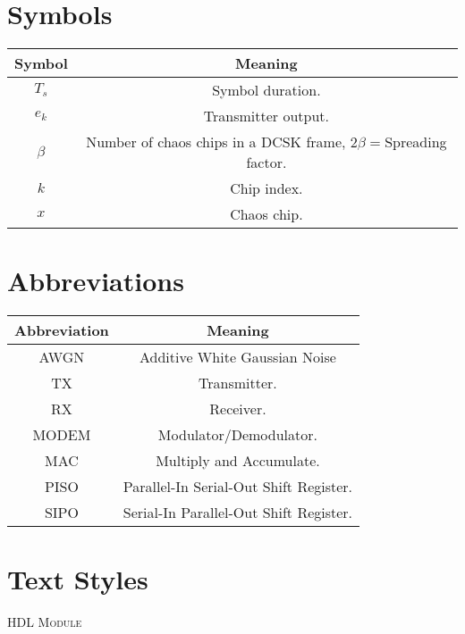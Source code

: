 \section*{Symbols}
\begin{center}
    \begin{tabular}{c c}
        \hline
        Symbol & Meaning\\
        \hline
        $T_s$ & Symbol duration.\\
        $e_k$ & Transmitter output.\\
        $\beta$ & Number of chaos chips in a DCSK frame, $2\beta = $Spreading factor.\\
        $k$ & Chip index.\\
        $x$ & Chaos chip.\\
        \hline
    \end{tabular}
\end{center}

\section*{Abbreviations}
\begin{center}
    \begin{tabular}{c c}
        \hline
        Abbreviation & Meaning\\
        \hline
        AWGN & Additive White Gaussian Noise\\
        TX & Transmitter.\\
        RX & Receiver.\\
        MODEM & Modulator/Demodulator.\\
        MAC & Multiply and Accumulate.\\
        PISO & Parallel-In Serial-Out Shift Register.\\
        SIPO & Serial-In Parallel-Out Shift Register.\\
        \hline
    \end{tabular}
\end{center}

\section*{Text Styles}
\textsc{HDL Module}

